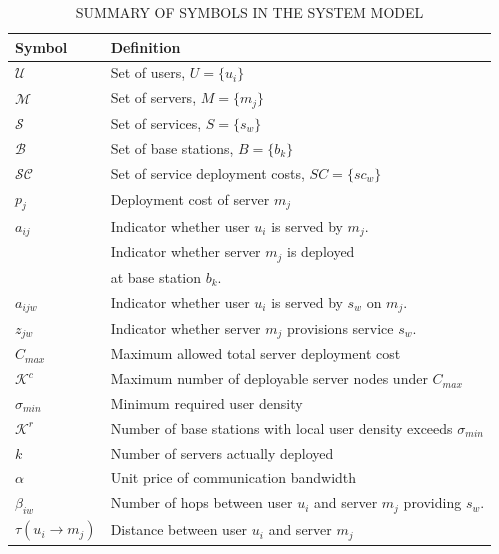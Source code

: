 \documentclass[10pt, conference, letterpaper]{IEEEtran}
\begin{document}
\begin{table}[!t]
\centering
\caption{SUMMARY OF SYMBOLS IN THE SYSTEM MODEL}
\label{table:variables_extended}
\begin{tabular}{|>{\centering\arraybackslash}m{2cm}|>{\raggedright\arraybackslash}m{6cm}|}
    \hline
    \textbf{Symbol} & \textbf{Definition} \\
    \hline
    $\mathcal{U}$ & Set of users, $U = \{u_i\}$ \\ \hline
    $\mathcal{M}$ & Set of servers, $M = \{m_j\}$ \\ \hline
    $\mathcal{S}$ & Set of services, $S = \{s_w\}$ \\ \hline
    $\mathcal{B}$ & Set of base stations, $B = \{b_k\}$ \\ \hline
    $\mathcal{SC}$ & Set of service deployment costs, $SC = \{sc_w\}$ \\ \hline
    $p_j$ & Deployment cost of server $m_j$ \\ \hline
    $a_{ij}$ & Indicator whether user $u_i$ is served by $m_j$.\\ \hline
    \multirow{2}{*}{$y_{jk}$} & Indicator whether server $m_j$ is deployed \\ 
    & at base station $b_k$.\\ \hline
    $a_{ijw}$ & Indicator whether user $u_i$ is served by $s_w$ on $m_j$. \\ \hline
    $z_{jw}$ & Indicator whether server $m_j$ provisions service $s_w$. \\ \hline
    $C_{max}$ & Maximum allowed total server deployment cost \\ \hline
    $\mathcal{K}^c$ & Maximum number of deployable server nodes under $C_{max}$ \\ \hline
    $\sigma_{min}$ & Minimum required user density \\ \hline
   $\mathcal{K}^r$ & Number of base stations with local user density exceeds $\sigma_{min}$ \\ \hline
    $k$ & Number of servers actually deployed \\ \hline
    $\alpha$ & Unit price of communication bandwidth \\ \hline
    $\beta_{iw}$ & Number of hops between user $u_i$ and server $m_j$ providing $s_w$. \\ \hline
    $\tau(u_i \rightarrow m_j)$ & Distance between user $u_i$ and server $m_j$ \\ \hline

\end{tabular}
\end{table}
\end{document}

